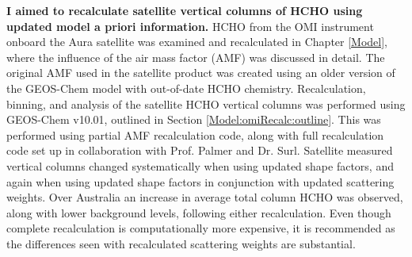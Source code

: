   \textbf{I aimed to recalculate satellite vertical columns of HCHO using updated model a priori information.}
  HCHO from the OMI instrument onboard the Aura satellite %
  was examined and recalculated in Chapter \ref{Model}, where the influence of the air mass factor (AMF) was discussed in detail. %
  The original AMF used in the satellite product was created using an older version of the GEOS-Chem model with out-of-date HCHO chemistry.
  Recalculation, binning, and analysis of the satellite HCHO vertical columns was performed using GEOS-Chem v10.01, outlined in Section \ref{Model:omiRecalc:outline}.
  This was performed using  partial AMF recalculation code, along with full recalculation code set up in collaboration with Prof. Palmer and Dr. Surl.
  Satellite measured vertical columns changed systematically when using updated shape factors, and again when using updated shape factors in conjunction with updated scattering weights.
  Over Australia an increase in average total column HCHO was observed, along with lower background levels, following either recalculation.
  Even though complete recalculation is computationally more expensive, it is recommended as the differences seen with recalculated scattering weights are substantial.
  
